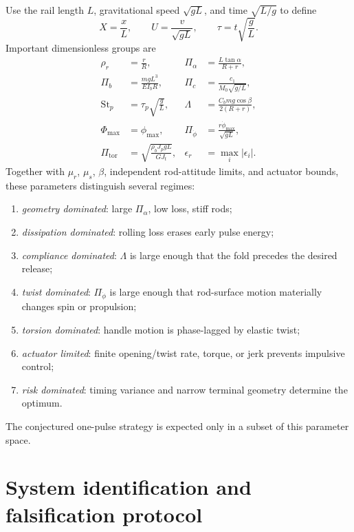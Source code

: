 \documentclass[11pt]{article}
\numberwithin{equation}{section}
\theoremstyle{definition}
\theoremstyle{remark}
\begin{document}
Use the rail length $L$, gravitational speed $\sqrt{gL}$, and time $\sqrt{L/g}$ to define
\begin{equation}
  X=\frac{x}{L},
  \qquad
  U=\frac{v}{\sqrt{gL}},
  \qquad
  \tau=t\sqrt{\frac{g}{L}}.
\end{equation}
Important dimensionless groups are
\begin{align}
  \rho_r&=\frac rR,
  &\Pi_\alpha&=\frac{L\tan\alpha}{R+r},\\
  \Pi_b&=\frac{mgL^3}{EI_bR},
  &\Pi_c&=\frac{c_1}{M_0\sqrt{g/L}},\\
  \mathrm{St}_p&=\tau_p\sqrt{\frac gL},
  &\Lambda&=\frac{C_bmg\cos\beta}{2(R+r)},\\
  \Phi_{\max}&=\phi_{\max},
  &\Pi_{\dot\phi}&=\frac{r\dot\phi_{\max}}{\sqrt{gL}},\\
  \Pi_{\mathrm{tor}}&=\sqrt{\frac{\rho_bJ_p gL}{GJ_t}},
  &\epsilon_r&=\max_i|\epsilon_i|.
  \label{eq:dimensionlessgroups}
\end{align}
Together with $\mu_r$, $\mu_s$, $\beta$, independent rod-attitude limits, and actuator bounds, these parameters distinguish several regimes:
\begin{enumerate}[label=(\alph*),leftmargin=2.2em]
  \item \emph{geometry dominated}: large $\Pi_\alpha$, low loss, stiff rods;
  \item \emph{dissipation dominated}: rolling loss erases early pulse energy;
  \item \emph{compliance dominated}: $\Lambda$ is large enough that the fold precedes the desired release;
  \item \emph{twist dominated}: $\Pi_{\dot\phi}$ is large enough that rod-surface motion materially changes spin or propulsion;
  \item \emph{torsion dominated}: handle motion is phase-lagged by elastic twist;
  \item \emph{actuator limited}: finite opening/twist rate, torque, or jerk prevents impulsive control;
  \item \emph{risk dominated}: timing variance and narrow terminal geometry determine the optimum.
\end{enumerate}
The conjectured one-pulse strategy is expected only in a subset of this parameter space.

\section{System identification and falsification protocol}
\end{document}
